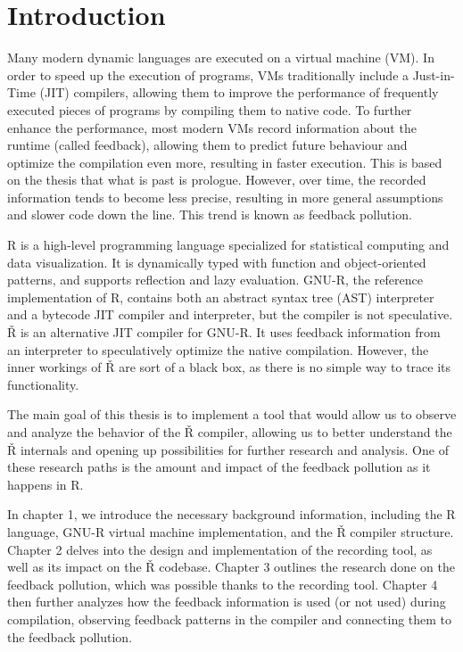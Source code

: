 \chapter*{Introduction}
\setcounter{page}{1}

Many modern dynamic languages are executed on a virtual machine (VM). In order to speed up the execution of programs, VMs traditionally include a Just-in-Time (JIT) compilers, allowing them to improve the performance of frequently executed pieces of programs by compiling them to native code. To further enhance the performance, most modern VMs record information about the runtime (called feedback), allowing them to predict future behaviour and optimize the compilation even more, resulting in faster execution. This is based on the thesis that what is past is prologue. However, over time, the recorded information tends to become less precise, resulting in more general assumptions and slower code down the line. This trend is known as feedback pollution.

R is a high-level programming language specialized for statistical computing and data visualization. It is dynamically typed with function and object-oriented patterns, and supports reflection and lazy evaluation. GNU-R, the reference implementation of R, contains both an abstract syntax tree (AST) interpreter and a bytecode JIT compiler and interpreter, but the compiler is not speculative. Ř is an alternative JIT compiler for GNU-R. It uses feedback information from an interpreter to speculatively optimize the native compilation. However, the inner workings of Ř are sort of a black box, as there is no simple way to trace its functionality.

The main goal of this thesis is to implement a tool that would allow us to observe and analyze the behavior of the Ř compiler, allowing us to better understand the Ř internals and opening up possibilities for further research and analysis. One of these research paths is the amount and impact of the feedback pollution as it happens in R.

In chapter 1, we introduce the necessary background information, including the R language, GNU-R virtual machine implementation, and the Ř compiler structure. Chapter 2 delves into the design and implementation of the recording tool, as well as its impact on the Ř codebase. Chapter 3 outlines the research done on the feedback pollution, which was possible thanks to the recording tool. Chapter 4 then further analyzes how the feedback information is used (or not used) during compilation, observing feedback patterns in the compiler and connecting them to the feedback pollution.

